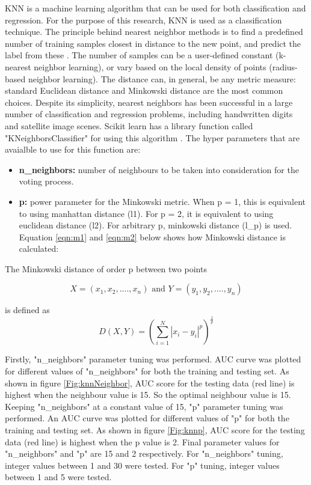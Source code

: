\documentclass[journal]{IEEEtran}
\begin{document}
KNN is a machine learning algorithm that can be used for both classification and regression. For the purpose of this research, KNN is used as a classification technique. The principle behind nearest neighbor methods is to find a predefined number of training samples closest in distance to the new point, and predict the label from these \cite{knn}. The number of samples can be a user-defined constant (k-nearest neighbor learning), or vary based on the local density of points (radius-based neighbor learning). The distance can, in general, be any metric measure: standard Euclidean distance and Minkowski distance are the most common choices. Despite its simplicity, nearest neighbors has been successful in a large number of classification and regression problems, including handwritten digits and satellite image scenes. Scikit learn has a library function called "KNeighborsClassifier"  for using this algorithm \cite{knn_scikit}. The hyper parameters that are avaialble to use for this function are:

\begin{itemize}
  \item \textbf{n\_neighbors:} number of neighbours to be taken into consideration for the voting process.
  \item \textbf{p:} power parameter for the Minkowski metric. When p = 1, this is equivalent to using manhattan distance (l1). For p = 2, it is equivalent to using euclidean distance (l2). For arbitrary p, minkowski distance (l\_p) is used. Equation \ref{eqn:m1} and  \ref{eqn:m2} below shows how Minkowski distance is calculated:\\
  
\end{itemize}

The Minkowski distance of order p between two points

\begin{equation}
\label{eqn:m1}
X = (x_1, x_2,....,x_n) \textrm{ and } Y = (y_1, y_2,....,y_n)
\end{equation}

is defined as
\begin{equation}
\label{eqn:m2}
D(X,Y) = (\sum\limits_{i=1}^N |x_i - y _i|^p)^\frac{1}{p}
\end{equation}

Firstly, "n\_neighbors" parameter tuning was performed. AUC curve was plotted for different values of "n\_neighbors" for both the training and testing set. As shown in figure \ref{Fig:knnNeighbor}, AUC score for the testing data (red line) is highest when the neighbour value is 15. So the optimal neighbour value is 15. Keeping "n\_neighbors" at a constant value of 15,  "p" parameter tuning was performed. An AUC curve was plotted for different values of "p" for both the training and testing set. As shown in figure \ref{Fig:knnp}, AUC score for the testing data (red line) is highest when the p value is 2. Final parameter values for "n\_neighbors" and "p" are 15 and 2 respectively. For "n\_neighbors" tuning, integer values between 1 and 30 were tested. For "p" tuning, integer values between 1 and 5 were tested. 
\end{document}
